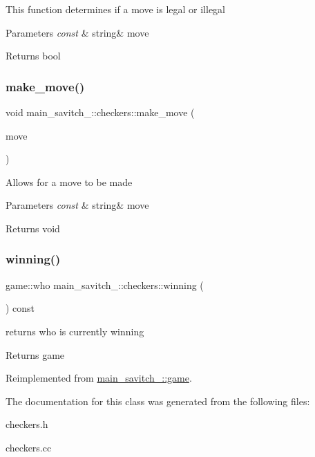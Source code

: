 This function determines if a move is legal or illegal 
\begin{DoxyParams}{Parameters}
{\em const} & string\& move \\
\hline
\end{DoxyParams}
\begin{DoxyReturn}{Returns}
bool 
\end{DoxyReturn}
\mbox{\label{classmain__savitch__14_1_1checkers_a8a08c0555d5b8c264472cc94a2f007e3}} 
\subsubsection{\texorpdfstring{make\+\_\+move()}{make\_move()}}
{\footnotesize\ttfamily void main\+\_\+savitch\+\_\+::checkers\+::make\+\_\+move (\begin{DoxyParamCaption}\item[{const string \&}]{move }\end{DoxyParamCaption})}

Allows for a move to be made 
\begin{DoxyParams}{Parameters}
{\em const} & string\& move \\
\hline
\end{DoxyParams}
\begin{DoxyReturn}{Returns}
void 
\end{DoxyReturn}
\mbox{\label{classmain__savitch__14_1_1checkers_aad9a08662e9fdf62752c60997b29370e}} 
\subsubsection{\texorpdfstring{winning()}{winning()}}
{\footnotesize\ttfamily game\+::who main\+\_\+savitch\+\_\+::checkers\+::winning (\begin{DoxyParamCaption}{ }\end{DoxyParamCaption}) const\hspace{0.3cm}{\ttfamily [virtual]}}

returns who is currently winning \begin{DoxyReturn}{Returns}
game 
\end{DoxyReturn}


Reimplemented from \hyperlink{classmain__savitch__14_1_1game_a2f0d5338c12bd98d52fe2383ece5c45e}{main\+\_\+savitch\+\_\+::game}.



The documentation for this class was generated from the following files\+:\begin{DoxyCompactItemize}
\item 
checkers.\+h\item 
checkers.\+cc\end{DoxyCompactItemize}
